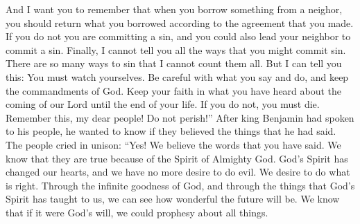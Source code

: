 And I want you to remember that when you borrow something from a neighor, you should return what you borrowed according to the agreement that you made. If you do not you are committing a sin, and you could also lead your neighbor to commit a sin.
\bverse \iffalse And finally, I cannot tell you all the things whereby ye may commit sin; for there are divers ways and means, even so many that I cannot number them. \fi
Finally, I cannot tell you all the ways that you might commit sin. There are so many ways to sin that I cannot count them all.
\bverse \iffalse But this much I can tell you, that if ye do not watch yourselves, and your thoughts, and your words, and your deeds, and observe the commandments of God, and continue in the faith of what ye have heard concerning the coming of our Lord, even unto the end of your lives, ye must perish. And now, O man, remember, and perish not. \fi
But I can tell you this: You must watch yourselves. Be careful with what you say and do, and keep the commandments of God. Keep your faith in what you have heard about the coming of our Lord until the end of your life. If you do not, you must die. Remember this, my dear people! Do not perish!''
\bchapter
\bverse \iffalse And now, it came to pass that when king Benjamin had thus spoken to his people, he sent among them, desiring to know of his people if they believed the words which he had spoken unto them. \fi
After king Benjamin had spoken to his people, he wanted to know if they believed the things that he had said.
\bverse \iffalse And they all cried with one voice, saying: Yea, we believe all the words which thou hast spoken unto us; and also, we know of their surety and truth, because of the Spirit of the Lord Omnipotent, which has wrought a mighty change in us, or in our hearts, that we have no more disposition to do evil, but to do good continually. \fi
The people cried in unison: ``Yes! We believe the words that you have said. We know that they are true because of the Spirit of Almighty God. God's Spirit has changed our hearts, and we have no more desire to do evil. We desire to do what is right.
\bverse \iffalse And we, ourselves, also, through the infinite goodness of God, and the manifestations of his Spirit, have great views of that which is to come; and were it expedient, we could prophesy of all things. \fi
Through the infinite goodness of God, and through the things that God's Spirit has taught to us, we can see how wonderful the future will be. We know that if it were God's will, we could prophesy about all things.
